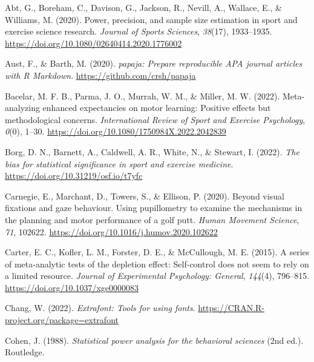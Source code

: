 \documentclass[
  doc, donotrepeattitle,floatsintext]{apa7}
\newlength{\cslhangindent}
\newlength{\cslentryspacingunit} %
\newenvironment{CSLReferences}[2] %
 {%
  \setlength{\parindent}{0pt}
  \ifodd #1
  \let\oldpar\par
  \def\par{\hangindent=\cslhangindent\oldpar}
  \fi
  \setlength{\parskip}{#2\cslentryspacingunit}
 }%
 {}
\begin{document}
\hypertarget{refs}{}
\begin{CSLReferences}{1}{0}
\leavevmode{}%
Abt, G., Boreham, C., Davison, G., Jackson, R., Nevill, A., Wallace, E., \& Williams, M. (2020). Power, precision, and sample size estimation in sport and exercise science research. \emph{Journal of Sports Sciences}, \emph{38}(17), 1933--1935. \url{https://doi.org/10.1080/02640414.2020.1776002}

\leavevmode{}%
Aust, F., \& Barth, M. (2020). \emph{{papaja}: {Prepare} reproducible {APA} journal articles with {R Markdown}}. \url{https://github.com/crsh/papaja}

\leavevmode{}%
Bacelar, M. F. B., Parma, J. O., Murrah, W. M., \& Miller, M. W. (2022). Meta-analyzing enhanced expectancies on motor learning: Positive effects but methodological concerns. \emph{International Review of Sport and Exercise Psychology}, \emph{0}(0), 1--30. \url{https://doi.org/10.1080/1750984X.2022.2042839}

\leavevmode{}%
Borg, D. N., Barnett, A., Caldwell, A. R., White, N., \& Stewart, I. (2022). \emph{The bias for statistical significance in sport and exercise medicine}. \url{https://doi.org/10.31219/osf.io/t7yfc}

\leavevmode{}%
Carnegie, E., Marchant, D., Towers, S., \& Ellison, P. (2020). Beyond visual fixations and gaze behaviour. Using pupillometry to examine the mechanisms in the planning and motor performance of a golf putt. \emph{Human Movement Science}, \emph{71}, 102622. \url{https://doi.org/10.1016/j.humov.2020.102622}

\leavevmode{}%
Carter, E. C., Kofler, L. M., Forster, D. E., \& McCullough, M. E. (2015). A series of meta-analytic tests of the depletion effect: Self-control does not seem to rely on a limited resource. \emph{Journal of Experimental Psychology: General}, \emph{144}(4), 796--815. \url{https://doi.org/10.1037/xge0000083}

\leavevmode{}%
Chang, W. (2022). \emph{Extrafont: Tools for using fonts}. \url{https://CRAN.R-project.org/package=extrafont}

\leavevmode{}%
Cohen, J. (1988). \emph{Statistical power analysis for the behavioral sciences} (2nd ed.). Routledge.


\end{CSLReferences}
\end{document}
